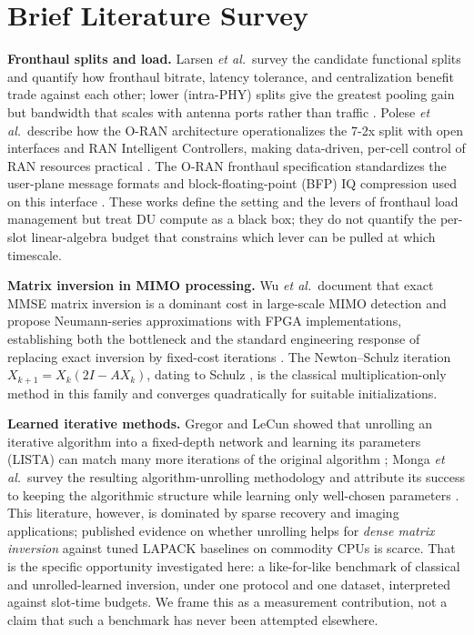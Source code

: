 \documentclass[11pt,a4paper]{article}
\begin{document}
\section{Brief Literature Survey}

\textbf{Fronthaul splits and load.} Larsen \emph{et al.}\ survey the
candidate functional splits and quantify how fronthaul bitrate, latency
tolerance, and centralization benefit trade against each other; lower
(intra-PHY) splits give the greatest pooling gain but bandwidth that scales
with antenna ports rather than traffic \cite{larsen2019survey}. Polese
\emph{et al.}\ describe how the O-RAN architecture operationalizes the 7-2x
split with open interfaces and RAN Intelligent Controllers, making
data-driven, per-cell control of RAN resources practical
\cite{polese2023oran}. The O-RAN fronthaul specification standardizes the
user-plane message formats and block-floating-point (BFP) IQ compression used
on this interface \cite{oran_cus}. These works define the setting and the
levers of fronthaul load management but treat DU compute as a black box; they
do not quantify the per-slot linear-algebra budget that constrains which lever
can be pulled at which timescale.

\textbf{Matrix inversion in MIMO processing.} Wu \emph{et al.}\ document that
exact MMSE matrix inversion is a dominant cost in large-scale MIMO detection
and propose Neumann-series approximations with FPGA implementations,
establishing both the bottleneck and the standard engineering response of
replacing exact inversion by fixed-cost iterations \cite{wu2014mimo}. The
Newton--Schulz iteration $X_{k+1} = X_k(2I - AX_k)$, dating to Schulz
\cite{schulz1933}, is the classical multiplication-only method in this family
and converges quadratically for suitable initializations.

\textbf{Learned iterative methods.} Gregor and LeCun showed that unrolling an
iterative algorithm into a fixed-depth network and learning its parameters
(LISTA) can match many more iterations of the original algorithm
\cite{gregor2010lista}; Monga \emph{et al.}\ survey the resulting
algorithm-unrolling methodology and attribute its success to keeping the
algorithmic structure while learning only well-chosen parameters
\cite{monga2021unrolling}. This literature, however, is dominated by sparse
recovery and imaging applications; published evidence on whether unrolling
helps for \emph{dense matrix inversion} against tuned LAPACK baselines on
commodity CPUs is scarce. That is the specific opportunity investigated here:
a like-for-like benchmark of classical and unrolled-learned inversion, under
one protocol and one dataset, interpreted against slot-time budgets. We frame
this as a measurement contribution, not a claim that such a benchmark has
never been attempted elsewhere.
\end{document}

